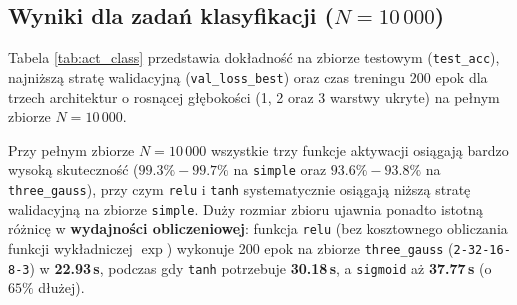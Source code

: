 \documentclass{article}
\begin{document}
\subsection{Wyniki dla zadań klasyfikacji ($N = 10\,000$)}

Tabela \ref{tab:act_class} przedstawia dokładność na zbiorze testowym (\texttt{test\_acc}), najniższą stratę walidacyjną (\texttt{val\_loss\_best}) oraz czas treningu 200 epok dla trzech architektur o rosnącej głębokości (1, 2 oraz 3 warstwy ukryte) na pełnym zbiorze $N = 10\,000$.

\begin{table}[H]
\centering
\caption{Porównanie funkcji aktywacji w warstwach ukrytych dla zadań klasyfikacji ($N = 10\,000$, wyjście \texttt{softmax}, błąd \texttt{CCE}).}
\label{tab:act_class}
\vspace{0.2cm}
\end{table}

Przy pełnym zbiorze $N = 10\,000$ wszystkie trzy funkcje aktywacji osiągają bardzo wysoką skuteczność ($99.3\% - 99.7\%$ na \texttt{simple} oraz $93.6\% - 93.8\%$ na \texttt{three\_gauss}), przy czym \texttt{relu} i \texttt{tanh} systematycznie osiągają niższą stratę walidacyjną na zbiorze \texttt{simple}. Duży rozmiar zbioru ujawnia ponadto istotną różnicę w \textbf{wydajności obliczeniowej}: funkcja \texttt{relu} (bez kosztownego obliczania funkcji wykładniczej $\exp$) wykonuje 200 epok na zbiorze \texttt{three\_gauss} (\texttt{2-32-16-8-3}) w \textbf{22.93\,s}, podczas gdy \texttt{tanh} potrzebuje \textbf{30.18\,s}, a \texttt{sigmoid} aż \textbf{37.77\,s} (o $65\%$ dłużej).
\end{document}
